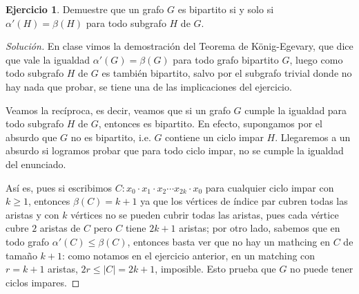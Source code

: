 \documentclass[12pt]{report}
\theoremstyle{plain}
\theoremstyle{definition}
\newtheorem{exercise}[theorem]{Ejercicio}
\newenvironment{solution}{\begin{proof}[Solución]}{\end{proof}}
\newcommand{\abs}[1]{\left \vert #1 \right \vert}
\begin{document}
\begin{exercise}
Demuestre que un grafo $G$ es bipartito si y solo si $\alpha ' (H) = \beta (H)$ para todo subgrafo $H$ de $G$.
\end{exercise}
\begin{solution}
En clase vimos la demostración del Teorema de König-Egevary, que dice que vale la igualdad $\alpha ' (G) = \beta (G)$ para todo grafo bipartito $G$, luego como todo subgrafo $H$ de $G$ es también bipartito, salvo por el subgrafo trivial donde no hay nada que probar, se tiene una de las implicaciones del ejercicio.

Veamos la recíproca, es decir, veamos que si un grafo $G$ cumple la igualdad para todo subgrafo $H$ de $G$, entonces es bipartito. En efecto, supongamos por el absurdo que $G$ no es bipartito, i.e. $G$ contiene un ciclo impar $H$. Llegaremos a un absurdo si logramos probar que para todo ciclo impar, no se cumple la igualdad del enunciado.

Así es, pues si escribimos $C: x_0 \cdot x_1 \cdot x_2 \cdots x_{2k} \cdot x_0$ para cualquier ciclo impar con $k \geq 1$, entonces $\beta (C) = k+1$ ya que los vértices de índice par cubren todas las aristas y con $k$ vértices no se pueden cubrir todas las aristas, pues cada vértice cubre $2$ aristas de $C$ pero $C$ tiene $2k+1$ aristas; por otro lado, sabemos que en todo grafo $\alpha ' (C) \leq \beta (C)$, entonces basta ver que no hay un mathcing en $C$ de tamaño $k+1$: como notamos en el ejercicio anterior, en un matching con $r = k+1$ aristas, $2 r \leq \abs C = 2k +1$, imposible. Esto prueba que $G$ no puede tener ciclos impares.
\end{solution}
\end{document}
